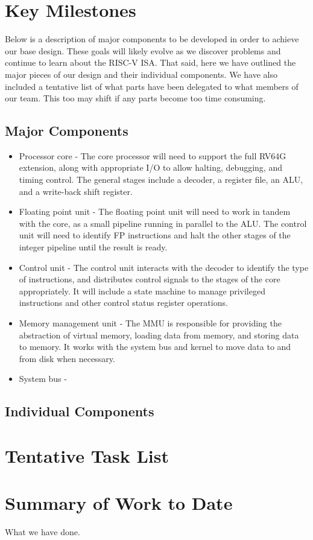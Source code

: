 \documentclass{article}
\begin{document}
\section{Key Milestones}
Below is a description of major components to be developed in order to achieve our base design.  These goals will likely evolve as we discover problems and continue to learn about the RISC-V ISA.  That said, here we have outlined the major pieces of our design and their individual components.  We have also included a tentative list of what parts have been delegated to what members of our team.  This too may shift if any parts become too time consuming.

\subsection{Major Components}
\begin{itemize}
    \item Processor core - The core processor will need to support the full RV64G extension, along with appropriate I/O to allow halting, debugging, and timing control.  The general stages include a decoder, a register file, an ALU, and a write-back shift register.
    
    \item Floating point unit - The floating point unit will need to work in tandem with the core, as a small pipeline running in parallel to the ALU.  The control unit will need to identify FP instructions and halt the other stages of the integer pipeline until the result is ready.
    
    \item Control unit - The control unit interacts with the decoder to identify the type of instructions, and distributes control signals to the stages of the core appropriately.  It will include a state machine to manage privileged instructions and other control status register operations.
    
    \item Memory management unit - The MMU is responsible for providing the abstraction of virtual memory, loading data from memory, and storing data to memory.  It works with the system bus and kernel to move data to and from disk when necessary.
    
    \item System bus -
    
\end{itemize}

\subsection{Individual Components}


\section{Tentative Task List}


\section{Summary of Work to Date}
What we have done.


\printbibliography
\end{document}
